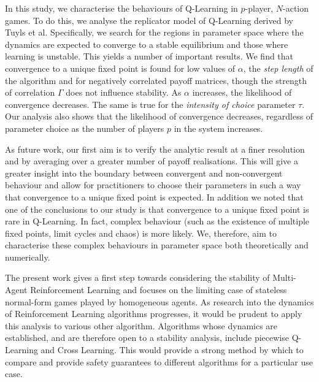 \documentclass[sigconf,anonymous]{aamas}
\begin{document}
In this study, we characterise the behaviours of Q-Learning in $p$-player, $N$-action games. To do this, we analyse the replicator model of Q-Learning derived by Tuyls et al. Specifically, we search for the regions in parameter space where the dynamics are expected to converge to a stable equilibrium and those where learning is unstable. This yields a number of important results. We find that convergence to a unique fixed point is found for low values of $\alpha$, the \textit{step length} of the algorithm and for negatively correlated payoff matrices, though the strength of correlation $\Gamma$ does not influence stability. As $\alpha$ increases, the likelihood of convergence decreases. The same is true for the \textit{intensity of choice} parameter $\tau$. Our analysis also shows that the likelihood of convergence decreases, regardless of parameter choice as the number of players $p$ in the system increases.

As future work, our first aim is to verify the analytic result at a finer resolution and by averaging over a greater number of payoff realisations. This will give a greater insight into the boundary between convergent and non-convergent behaviour and allow for practitioners to choose their parameters in such a way that convergence to a unique fixed point is expected. In addition we noted that one of the conclusions to our study is that convergence to a unique fixed point is rare in Q-Learning. In fact, complex behaviour (such as the existence of multiple fixed points, limit cycles and chaos) is more likely. We, therefore, aim to characterise these complex behaviours in parameter space both theoretically and numerically.

The present work gives a first step towards considering the stability of Multi-Agent Reinforcement Learning and focuses on the limiting case of stateless normal-form games played by homogeneous agents. As research into the dynamics of Reinforcement Learning algorithms progresses, it would be prudent to apply this analysis to various other algorithm. Algorithms whose dynamics are established, and are therefore open to a stability analysis, include piecewise Q-Learning and Cross Learning. This would provide a strong method by which to compare and provide safety guarantees to different algorithms for a particular use case. 


\end{document}
